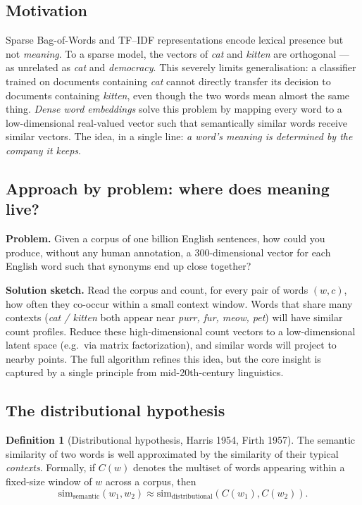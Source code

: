 \documentclass[12pt,a4paper]{report}
\theoremstyle{definition}
\newtheorem{definition}{Definition}[section]
\theoremstyle{remark}
\begin{document}
\subsection{Motivation}
Sparse Bag-of-Words and TF--IDF representations encode lexical presence but not \emph{meaning}. To a sparse model, the vectors of \emph{cat} and \emph{kitten} are orthogonal --- as unrelated as \emph{cat} and \emph{democracy}. This severely limits generalisation: a classifier trained on documents containing \emph{cat} cannot directly transfer its decision to documents containing \emph{kitten}, even though the two words mean almost the same thing. \emph{Dense word embeddings} solve this problem by mapping every word to a low-dimensional real-valued vector such that semantically similar words receive similar vectors. The idea, in a single line: \emph{a word's meaning is determined by the company it keeps}.

\subsection{Approach by problem: where does meaning live?}
\textbf{Problem.} Given a corpus of one billion English sentences, how could you produce, without any human annotation, a 300-dimensional vector for each English word such that synonyms end up close together?

\textbf{Solution sketch.} Read the corpus and count, for every pair of words $(w, c)$, how often they co-occur within a small context window. Words that share many contexts (\emph{cat / kitten} both appear near \emph{purr, fur, meow, pet}) will have similar count profiles. Reduce these high-dimensional count vectors to a low-dimensional latent space (e.g.\ via matrix factorization), and similar words will project to nearby points. The full algorithm refines this idea, but the core insight is captured by a single principle from mid-20th-century linguistics.

\subsection{The distributional hypothesis}

\begin{definition}[Distributional hypothesis, Harris 1954, Firth 1957]
The semantic similarity of two words is well approximated by the similarity of their typical \emph{contexts}. Formally, if $C(w)$ denotes the multiset of words appearing within a fixed-size window of $w$ across a corpus, then
\[ \mathrm{sim}_{\text{semantic}}(w_1, w_2) \approx \mathrm{sim}_{\text{distributional}}(C(w_1), C(w_2)). \]
\end{definition}
\end{document}
